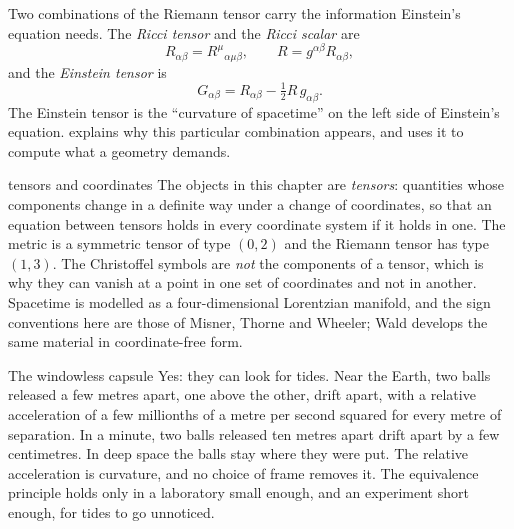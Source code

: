 Two combinations of the Riemann tensor carry the information Einstein's
equation needs. The \emph{Ricci tensor} and the \emph{Ricci scalar} are
\begin{equation*}
  R_{\alpha\beta} = R^{\mu}{}_{\alpha\mu\beta}, \qquad R = g^{\alpha\beta}R_{\alpha\beta},
\end{equation*}
and the \emph{Einstein tensor} is
\begin{equation}
  G_{\alpha\beta} = R_{\alpha\beta} - \tfrac{1}{2}R\,g_{\alpha\beta}.
  \label{eq:einstein-tensor}
\end{equation}
The Einstein tensor is the \enquote{curvature of spacetime} on the left side of
Einstein's equation.  explains why this particular
combination appears, and uses it to compute what a geometry demands.

\begin{deeper}{tensors and coordinates}
The objects in this chapter are \emph{tensors}: quantities whose components
change in a definite way under a change of coordinates, so that an equation
between tensors holds in every coordinate system if it holds in one. The metric
is a symmetric tensor of type $(0,2)$ and the Riemann tensor has type $(1,3)$.
The Christoffel symbols are \emph{not} the components of a tensor, which is why
they can vanish at a point in one set of coordinates and not in another.
Spacetime is modelled as a four-dimensional Lorentzian manifold, and the sign
conventions here are those of Misner, Thorne and Wheeler; Wald develops the
same material in coordinate-free form.
\end{deeper}

\begin{revisited}{The windowless capsule}
Yes: they can look for tides. Near the Earth, two balls released a few metres
apart, one above the other, drift apart, with a relative acceleration of a few
millionths of a metre per second squared for every metre of separation. In a
minute, two balls released ten metres apart drift apart by a few
centimetres. In deep space the balls stay where they were
put. The relative acceleration is curvature, and no choice of frame removes
it. The equivalence principle holds only in a laboratory small enough, and an
experiment short enough, for tides to go unnoticed.
\end{revisited}


